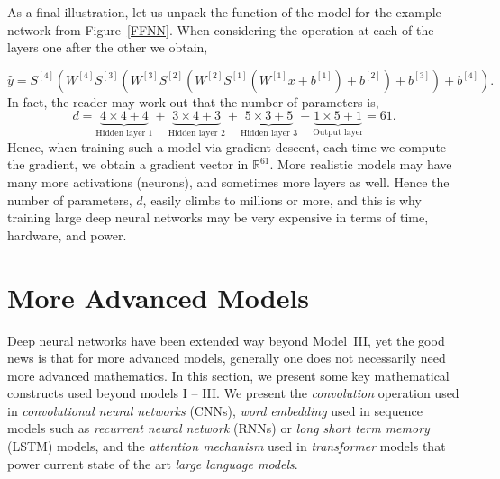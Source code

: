\documentclass[12pt]{article}
\begin{document}
As a final illustration, let us unpack the function of the model for the example network from Figure~\ref{FFNN}. When considering the operation at each of the layers one after the other we obtain,

\begin{equation}
\label{eqn:opened-out-example-2}
\hat{y} =S^{[4]}(W^{[4]}S^{[3]}(W^{[3]}S^{[2]}(W^{[2]}S^{[1]}(W^{[1]}x+b^{[1]})+b^{[2]}) +b^{[3]})+b^{[4]}).
\end{equation}
In fact, the reader may work out that the number of parameters is,
%
\begin{equation}
\label{eq:61-is-the-number}
d = \underbrace{4\times4 + 4}_{\text{Hidden layer 1}} + \underbrace{3\times 4 + 3}_{\text{Hidden layer 2}}+ \underbrace{5\times 3 + 5}_{\text{Hidden layer 3}}  + \underbrace{1 \times 5 +1}_{\text{Output layer}}  = 61.
\end{equation}
%
Hence, when training such a model via gradient descent, each time we compute the gradient, we obtain a gradient vector in ${\mathbb R}^{61}$. More realistic models may have many more activations (neurons), and sometimes more layers as well. Hence the number of parameters, $d$, easily climbs to millions or more, and this is why training large deep neural networks may be very expensive in terms of time, hardware, and power.

\section{More Advanced Models}
\label{sec:more-advanced-models}

Deep neural networks have been extended way beyond Model~III, yet the good news is that for more advanced models, generally one does not necessarily need more advanced mathematics. In this section, we present some key mathematical constructs used beyond models I -- III. We present  the {\em convolution} operation used in {\em convolutional neural networks} (CNNs), {\em word embedding} used in sequence models such as {\em recurrent neural network} (RNNs) or {\em long short term memory} (LSTM) models, and the {\em attention mechanism} used in {\em transformer} models that power current state of the art {\em large language models}.
\end{document}
